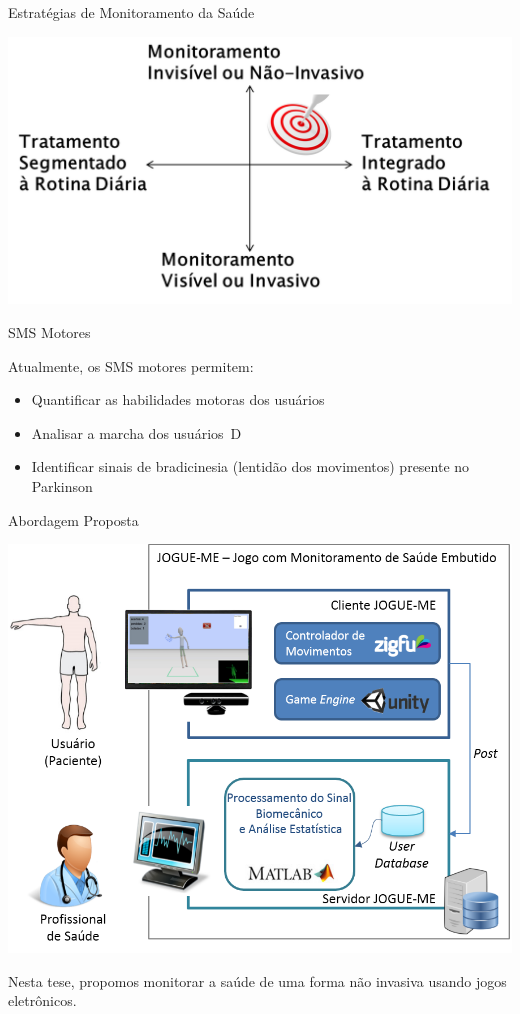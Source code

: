 \documentclass{beamer}
\begin{document}
\begin{frame}{Estratégias de Monitoramento da Saúde}
  \begin{block}{}
      \center \includegraphics[height=2.2 in]{img/estrategmonitorament.png}
  \end{block}
\end{frame}


\begin{frame}{SMS Motores}  
  \begin{block}{}  
  Atualmente, os SMS motores permitem:  
    \begin{itemize}
    \item Quantificar as habilidades motoras dos usuários~\cite{manumeterjbhi2014,patel_monitoring_2009}
    \item Analisar a marcha dos usuários~\cite{robotgait2014}D
    \item Identificar sinais de bradicinesia (lentidão dos movimentos) presente no Parkinson~\cite{ambulatoryparkinson2010}
    \end{itemize}   
  \end{block}   
\end{frame}

\begin{frame}{Abordagem Proposta}
  \begin{block}{}
      \center \includegraphics[height=1.8 in]{img/visaosistema.png}
  \end{block}
  \begin{block}{ }
Nesta tese, propomos monitorar a saúde de uma forma não invasiva usando jogos eletrônicos. 
  \end{block}
\end{frame}
\end{document}
